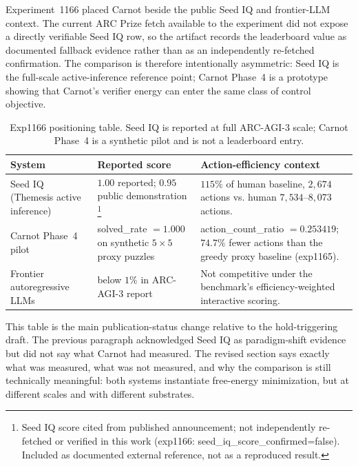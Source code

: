 \documentclass[10pt]{article}
\begin{document}
Experiment~1166 placed Carnot beside the public Seed IQ and
frontier-LLM context. The current ARC Prize fetch available to the
experiment did not expose a directly verifiable Seed IQ row, so the
artifact records the leaderboard value as documented fallback
evidence rather than as an independently re-fetched confirmation.
The comparison is therefore intentionally asymmetric: Seed IQ is
the full-scale active-inference reference point; Carnot Phase~4 is a
prototype showing that Carnot's verifier energy can enter the same
class of control objective.

\begin{table}[ht]
  \centering
  \caption{Exp1166 positioning table. Seed IQ is reported at full
  ARC-AGI-3 scale; Carnot Phase~4 is a synthetic pilot and is not a
  leaderboard entry.}
  \label{tab:arcagi3-context}
  \begin{tabular}{p{4.0cm} p{3.0cm} p{6.0cm}}
    \toprule
    System & Reported score & Action-efficiency context \\
    \midrule
    Seed IQ (Themesis active inference) &
      $1.00$ reported; $0.95$ public demonstration%
      \footnote{Seed IQ score cited from published announcement; not
      independently re-fetched or verified in this work
      (exp1166: seed\_iq\_score\_confirmed=false). Included as
      documented external reference, not as a reproduced result.} &
      $115\%$ of human baseline, $2{,}674$ actions vs. human
      $7{,}534$--$8{,}073$ actions. \\
    Carnot Phase~4 pilot &
      solved\_rate $=1.000$ on synthetic $5\times5$ proxy puzzles &
      action\_count\_ratio $=0.253419$; $74.7\%$ fewer actions than
      the greedy proxy baseline (exp1165). \\
    Frontier autoregressive LLMs &
      below $1\%$ in ARC-AGI-3 report &
      Not competitive under the benchmark's efficiency-weighted
      interactive scoring. \\
    \bottomrule
  \end{tabular}
\end{table}

This table is the main publication-status change relative to the
hold-triggering draft. The previous paragraph acknowledged Seed IQ
as paradigm-shift evidence but did not say what Carnot had measured.
The revised section says exactly what was measured, what was not
measured, and why the comparison is still technically meaningful:
both systems instantiate free-energy minimization, but at different
scales and with different substrates.
\end{document}
